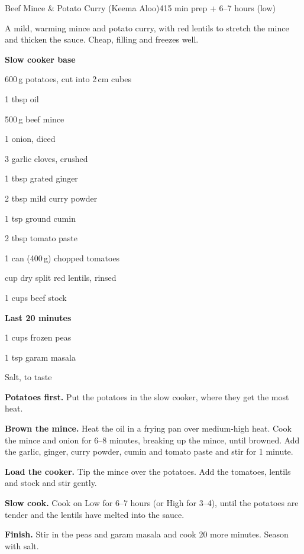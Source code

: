 \begin{recipebox}{Beef Mince \& Potato Curry (Keema Aloo)}{4}{15 min prep + 6--7 hours (low)}

A mild, warming mince and potato curry, with red lentils to stretch the mince
and thicken the sauce. Cheap, filling and freezes well.

\begin{ingredients}
  \item[] \textbf{Slow cooker base}
  \item 600\,g potatoes, cut into 2\,cm cubes
  \item 1 tbsp oil
  \item 500\,g beef mince
  \item 1 onion, diced
  \item 3 garlic cloves, crushed
  \item 1 tbsp grated ginger
  \item 2 tbsp mild curry powder
  \item 1 tsp ground cumin
  \item 2 tbsp tomato paste
  \item 1 can (400\,g) chopped tomatoes
  \item {} cup dry split red lentils, rinsed
  \item 1 cups beef stock
  \item[] \textbf{Last 20 minutes}
  \item 1 cups frozen peas
  \item 1 tsp garam masala
  \item Salt, to taste
\end{ingredients}

\begin{method}
  \item \textbf{Potatoes first.} Put the potatoes in the slow cooker, where they get
        the most heat.
  \item \textbf{Brown the mince.} Heat the oil in a frying pan over medium-high heat.
        Cook the mince and onion for 6--8 minutes, breaking up the mince, until
        browned. Add the garlic, ginger, curry powder, cumin and tomato paste and
        stir for 1 minute.
  \item \textbf{Load the cooker.} Tip the mince over the potatoes. Add the tomatoes,
        lentils and stock and stir gently.
  \item \textbf{Slow cook.} Cook on Low for 6--7 hours (or High for 3--4), until the
        potatoes are tender and the lentils have melted into the sauce.
  \item \textbf{Finish.} Stir in the peas and garam masala and cook 20 more minutes.
        Season with salt.
\end{method}


\end{recipebox}
